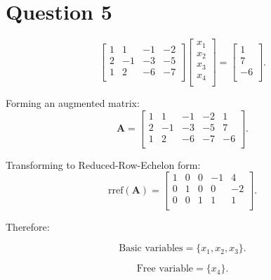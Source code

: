 \documentclass{article}
\begin{document}
\clearpage
\section{Question 5}
\[
\begin{bmatrix}
    1 & 1 & -1 & -2 \\
    2 & -1 & -3  & -5 \\
    1 & 2 & -6 & -7  \\
\end{bmatrix}
\begin{bmatrix}
    x_1 \\ x_2 \\ x_3 \\ x_4 \\
\end{bmatrix}
=
\begin{bmatrix}
    1 \\ 7 \\ -6 \\
\end{bmatrix}
.\]

Forming an augmented matrix:
\[
    \mathbf{A}
    =
    \begin{bmatrix}
        1 & 1 & -1  & -2 & 1  \\
        2 & -1 & -3 & -5 & 7  \\
        1 & 2 & -6  & -7 & -6 \\
    \end{bmatrix}
.\]

Transforming to Reduced-Row-Echelon form:
\[
    \text{rref}(\mathbf{A})
    =
    \begin{bmatrix}
        1 & 0 & 0 & -1  & 4  \\
        0 & 1 & 0 &  0  & -2 \\
        0 & 0 & 1 &  1  & 1  \\
    \end{bmatrix}
.\]
 
Therefore:

\[
    \text{Basic variables} = \{ x_1, x_2, x_3 \}
.\]


\[
    \text{Free variable} = \{ x_4 \}
.\]
\end{document}
